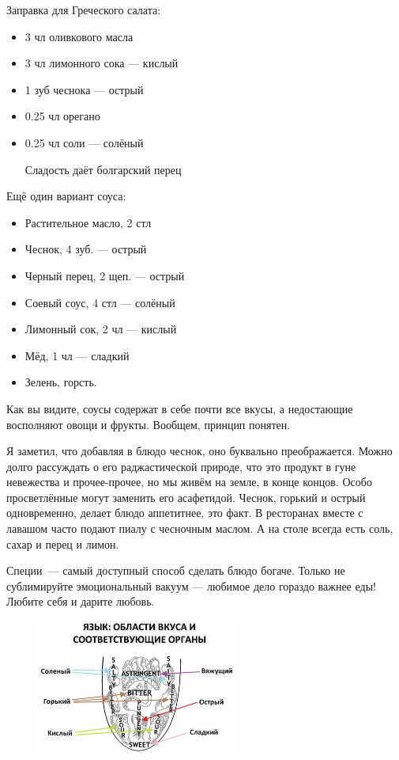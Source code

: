 Заправка для Греческого салата:
\begin{itemize}
\item 3 чл оливкового масла
\item 3 чл лимонного сока — кислый
\item 1 зуб чеснока — острый
\item 0.25 чл орегано     %
\item 0.25 чл соли — солёный

    Сладость даёт болгарский перец
\end{itemize}

Ещё один вариант соуса:
\begin{itemize}
\item Растительное масло, 2 стл
\item Чеснок, 4 зуб. — острый
\item Черный перец, 2 щеп. — острый
\item Соевый соус, 4 стл — солёный
\item Лимонный сок, 2 чл — кислый
\item Мёд, 1 чл — сладкий
\item Зелень, горсть.    %

\end{itemize}

Как вы видите, соусы содержат в себе почти все вкусы, а недостающие восполняют овощи и фрукты. Вообщем, принцип понятен.

Я заметил, что добавляя в блюдо чеснок, оно буквально преображается. Можно долго рассуждать о его раджастической природе, что это продукт в гуне невежества и прочее-прочее, но мы живём на земле, в конце концов. Особо просветлённые могут заменить его асафетидой. Чеснок, горький и острый одновременно, делает блюдо аппетитнее, это факт. В ресторанах вместе с лавашом часто подают пиалу с чесночным маслом. А на столе всегда есть соль, сахар и перец и лимон.

Специи~--- самый доступный способ сделать блюдо богаче. Только не сублимируйте эмоциональный вакуум — любимое дело гораздо важнее еды! Любите себя и дарите любовь.


\begin{figure}[ht]
    \centering
    \includegraphics[width=0.6\textwidth]{img/SixTastes}
    \label{fig:1}
\end{figure} 

